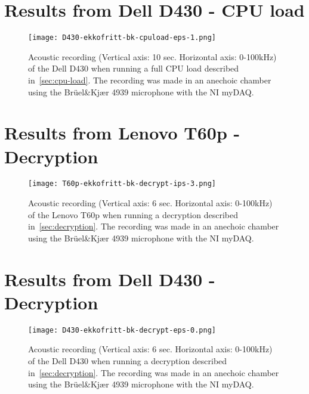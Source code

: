 \section{Results from Dell D430 - CPU load}\label{sec:d430_results_cpuload}

\begin{wrapfigure}{r}{1\textwidth}
    \centering
    \texttt{[image: D430-ekkofritt-bk-cpuload-eps-1.png]}
    \caption{Acoustic recording (Vertical axis: 10 sec. Horizontal axis: 0-100kHz) of the Dell D430 when running a full CPU load described in~\autoref{sec:cpu-load}. The recording was made in an anechoic chamber using the Brüel\&Kjær 4939 microphone with the NI myDAQ. }
    \label{fig:D430-ekkofritt-bk-cpuload-eps-1}
\end{wrapfigure}


\section{Results from Lenovo T60p - Decryption}\label{sec:t60p_results_decryption}

\begin{wrapfigure}{r}{1\textwidth}
    \centering
    \texttt{[image: T60p-ekkofritt-bk-decrypt-ips-3.png]}
    \caption{Acoustic recording (Vertical axis: 6 sec. Horizontal axis: 0-100kHz) of the Lenovo T60p when running a decryption described in~\autoref{sec:decryption}. The recording was made in an anechoic chamber using the Brüel\&Kjær 4939 microphone with the NI myDAQ. }
    \label{fig:T60p-ekkofritt-bk-decrypt-ips-3}
\end{wrapfigure}

\section{Results from Dell D430 - Decryption}\label{sec:d430_results_cpuload}

\begin{wrapfigure}{r}{1\textwidth}
    \centering
    \texttt{[image: D430-ekkofritt-bk-decrypt-eps-0.png]}
    \caption{Acoustic recording (Vertical axis: 6 sec. Horizontal axis: 0-100kHz) of the Dell D430 when running a decryption described in~\autoref{sec:decryption}. The recording was made in an anechoic chamber using the Brüel\&Kjær 4939 microphone with the NI myDAQ. }
    \label{fig:D430-ekkofritt-bk-decrypt-eps-0}
\end{wrapfigure}


